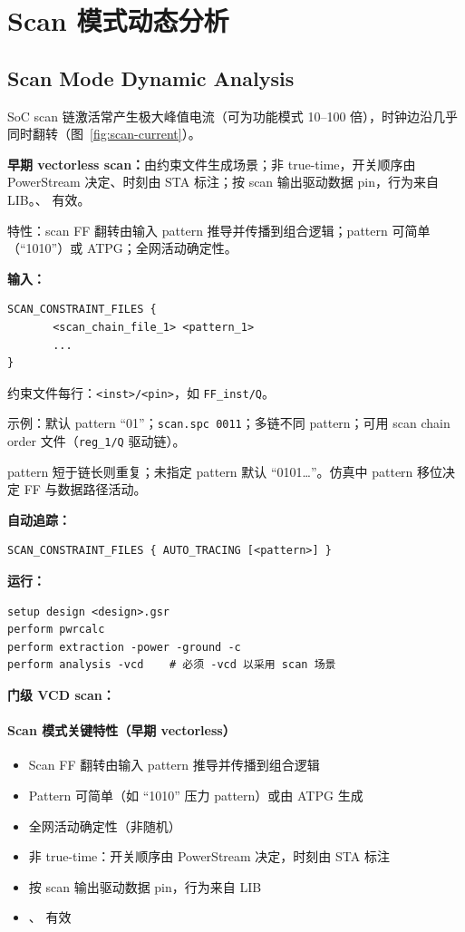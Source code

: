 \section{Scan 模式动态分析}
\subsection*{Scan Mode Dynamic Analysis}

SoC scan 链激活常产生极大峰值电流（可为功能模式 10--100 倍），时钟边沿几乎同时翻转（图~\ref{fig:scan-current}）。


\textbf{早期 vectorless scan：}由约束文件生成场景；非 true-time，开关顺序由 PowerStream 决定、时刻由 STA 标注；按 scan 输出驱动数据 pin，行为来自 LIB。、 有效。

特性：scan FF 翻转由输入 pattern 推导并传播到组合逻辑；pattern 可简单（``1010''）或 ATPG；全网活动确定性。

\textbf{输入：}
\begin{lstlisting}
SCAN_CONSTRAINT_FILES {
       <scan_chain_file_1> <pattern_1>
       ...
}
\end{lstlisting}

约束文件每行：\texttt{<inst>/<pin>}，如 \texttt{FF\_inst/Q}。

示例：默认 pattern ``01''；\texttt{scan.spc 0011}；多链不同 pattern；可用 scan chain order 文件（\texttt{reg\_1/Q} 驱动链）。

pattern 短于链长则重复；未指定 pattern 默认 ``0101…''。仿真中 pattern 移位决定 FF 与数据路径活动。

\textbf{自动追踪：}
\begin{lstlisting}
SCAN_CONSTRAINT_FILES { AUTO_TRACING [<pattern>] }
\end{lstlisting}

\textbf{运行：}
\begin{lstlisting}
setup design <design>.gsr
perform pwrcalc
perform extraction -power -ground -c
perform analysis -vcd    # 必须 -vcd 以采用 scan 场景
\end{lstlisting}

\textbf{门级 VCD scan：}
\paragraph{Scan 模式关键特性（早期 vectorless）}
\begin{itemize}
  \item Scan FF 翻转由输入 pattern 推导并传播到组合逻辑
  \item Pattern 可简单（如 ``1010'' 压力 pattern）或由 ATPG 生成
  \item 全网活动确定性（非随机）
  \item 非 true-time：开关顺序由 PowerStream 决定，时刻由 STA 标注
  \item 按 scan 输出驱动数据 pin，行为来自 LIB
  \item {}、 有效
\end{itemize}

